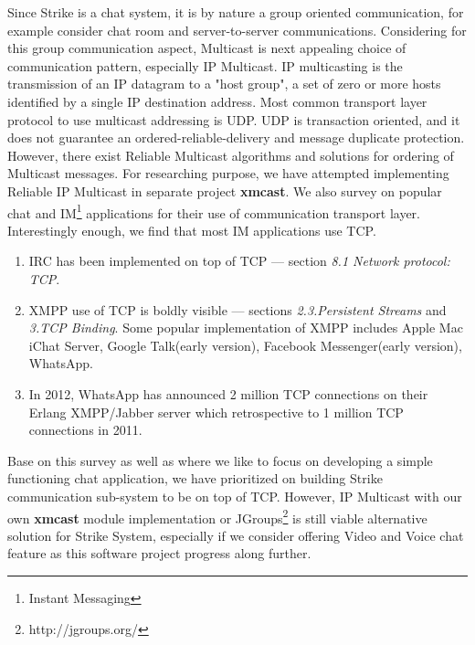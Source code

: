 \documentclass[dareport.tex]{subfiles}
\begin{document}
Since Strike is a chat system, it is by nature a group oriented communication, for example consider chat room and server-to-server communications. Considering for this group communication aspect, Multicast is next appealing choice of communication pattern, especially IP Multicast. IP multicasting is the transmission of an IP datagram to a "host group", a set of zero or more hosts identified by a single IP destination address\cite{ipmcast}. Most common transport layer protocol to use multicast addressing is UDP. UDP is transaction oriented, and it does not guarantee an ordered-reliable-delivery and message duplicate protection\cite{udp}. However, there exist Reliable Multicast algorithms and solutions for ordering of Multicast messages\cite{coulouris}. For researching purpose, we have attempted implementing Reliable IP Multicast in separate project \textbf{xmcast}. We also survey on popular chat and IM\footnote{Instant Messaging} applications for their use of communication transport layer. Interestingly enough, we find that most IM applications use TCP. 

\begin{enumerate}[leftmargin=*]

\item IRC has been implemented on top of TCP --- \cite{irc} section \emph{8.1 Network protocol: TCP}.

\item XMPP use of TCP is boldly visible --- \cite{xmpp} sections \emph{2.3.Persistent Streams} and \emph{3.TCP Binding}. Some popular implementation of XMPP includes Apple Mac iChat Server, Google Talk(early version), Facebook Messenger(early version), WhatsApp.

\item In 2012, WhatsApp has announced 2 million TCP connections on their Erlang XMPP/Jabber server which retrospective to 1 million TCP connections in 2011\cite{whatsapp}.

\end{enumerate}

Base on this survey as well as where we like to focus on developing a simple functioning chat application, we have prioritized on building Strike communication sub-system to be on top of TCP. However, IP Multicast with our own \textbf{xmcast} module implementation or JGroups\footnote{http://jgroups.org/} is still viable alternative solution for Strike System, especially if we consider offering Video and Voice chat feature as this software project progress along further.
\end{document}

